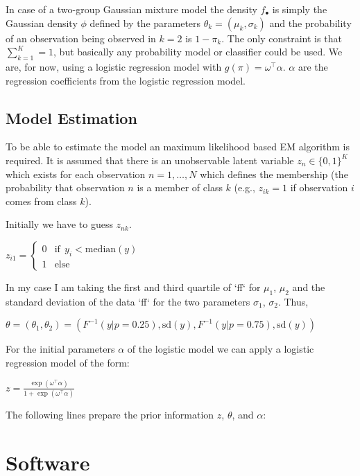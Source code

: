 \documentclass[article,nojss,shortnames]{jss}
\begin{document}
In case of a two-group Gaussian mixture model the density $f_\bullet$ is simply the
Gaussian density $\phi$ defined by the parameters $\theta_k = (\mu_k, \sigma_k)$ and
the probability of an observation being observed in $k=2$ is $1 - \pi_k$.
The only constraint is that $\sum_{k=1}^K = 1$, but basically any probability model
or classifier could be used. We are, for now, using a logistic regression model
with $g(\pi) = \omega^\top \alpha$. $\alpha$ are the regression coefficients from
the logistic regression model.



\subsection{Model Estimation}

To be able to estimate the model an maximum likelihood based EM algorithm is required.
It is assumed that there is an unobservable latent variable $z_n \in \{0, 1\}^K$
which exists for each observation $n = 1, \dots, N$ which defines the membership (the probability
that observation $n$ is a member of class $k$ (e.g., $z_{ik} = 1$ if observation $i$ comes from
class $k$).

Initially we have to guess $z_{nk}$.

$z_{i1} = \begin{cases} 0 & \text{if} ~~ y_i < \text{median}(y) \\ 1 & \text{else}\end{cases}$

In my case I am taking the first and third quartile
of `ff` for $\mu_1$, $\mu_2$ and the standard deviation of the data `ff` for the two
parameters $\sigma_1$, $\sigma_2$. Thus,

$\theta = (\theta_1, \theta_2) = (F^{-1}(y|p = 0.25), \text{sd}(y), F^{-1}(y|p = 0.75), \text{sd}(y))$

For the initial parameters $\alpha$ of the logistic model we can
apply a logistic regression model of the form:

$z = \frac{\exp(\omega^\top \alpha)}{1 + \exp(\omega^\top \alpha)}$

The following lines prepare the prior information $z$, $\theta$, and $\alpha$:





\section{Software}
\end{document}
